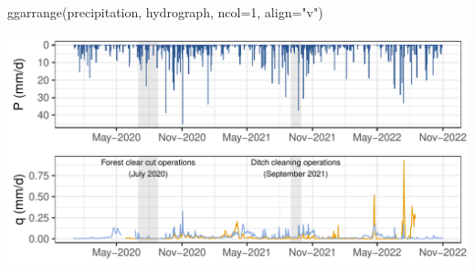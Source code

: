 \documentclass[
  letterpaper,
  DIV=11,
  numbers=noendperiod]{scrartcl}
\newenvironment{Shaded}{\begin{snugshade}}{\end{snugshade}}
\newcommand{\AttributeTok}[1]{\textcolor[rgb]{0.40,0.45,0.13}{#1}}
\newcommand{\DecValTok}[1]{\textcolor[rgb]{0.68,0.00,0.00}{#1}}
\newcommand{\FunctionTok}[1]{\textcolor[rgb]{0.28,0.35,0.67}{#1}}
\newcommand{\NormalTok}[1]{\textcolor[rgb]{0.00,0.23,0.31}{#1}}
\newcommand{\StringTok}[1]{\textcolor[rgb]{0.13,0.47,0.30}{#1}}
\begin{document}
\begin{Shaded}
\begin{Highlighting}[]
\FunctionTok{ggarrange}\NormalTok{(precipitation, hydrograph,}
          \AttributeTok{ncol=}\DecValTok{1}\NormalTok{, }\AttributeTok{align=}\StringTok{"v"}\NormalTok{)}
\end{Highlighting}
\end{Shaded}

\includegraphics{index_files/figure-pdf/unnamed-chunk-2-1.pdf}
\end{document}
